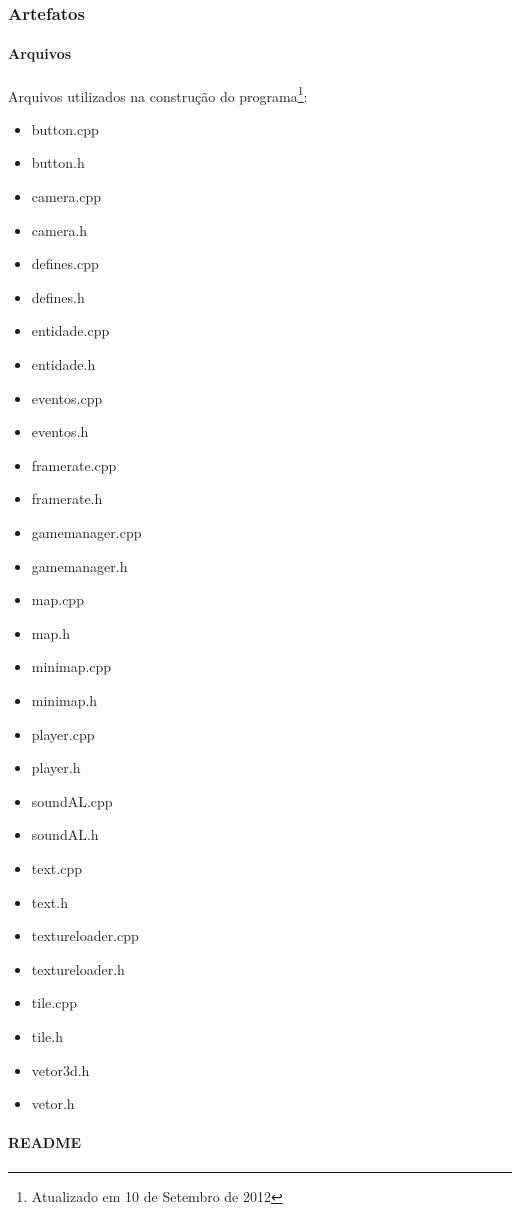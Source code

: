 \subsubsection{Artefatos}\label{artefatos}

\paragraph{\textbf{Arquivos}}

Arquivos utilizados na construção do programa\footnote{Atualizado em 10 de Setembro de 2012}:\\

\begin{itemize}
	\item button.cpp
	\item button.h
	\item camera.cpp
	\item camera.h
	\item defines.cpp
	\item defines.h
	\item entidade.cpp
	\item entidade.h
	\item eventos.cpp
	\item eventos.h
	\item framerate.cpp
	\item framerate.h
	\item gamemanager.cpp
	\item gamemanager.h
	\item map.cpp
	\item map.h
	\item minimap.cpp
	\item minimap.h
	\item player.cpp
	\item player.h
	\item soundAL.cpp
	\item soundAL.h
	\item text.cpp
	\item text.h
	\item textureloader.cpp
	\item textureloader.h
	\item tile.cpp
	\item tile.h
	\item vetor3d.h
	\item vetor.h
	
\end{itemize}

\paragraph{\textbf{README}}

